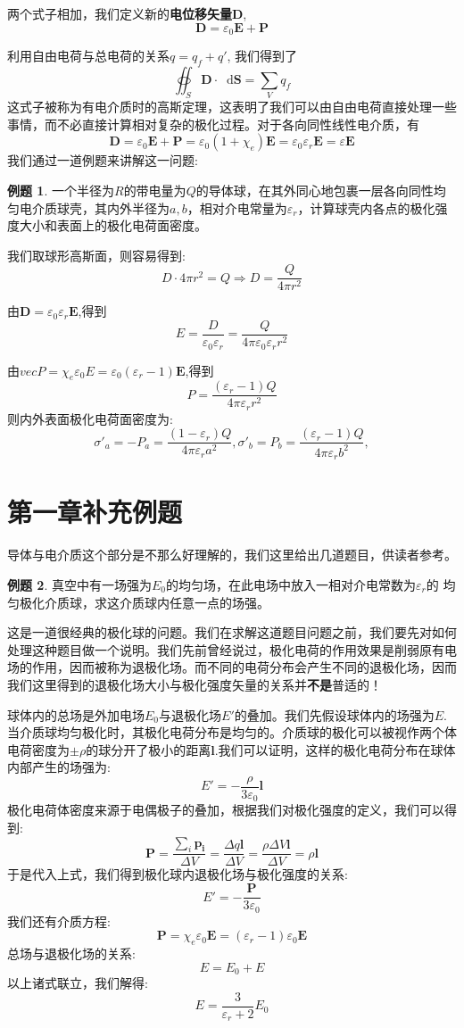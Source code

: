 \documentclass[12pt,a4paper,oneside]{report}
\theoremstyle{definition}
\newtheorem{example}{例题}[chapter]
\theoremstyle{remark}
\renewcommand{\d}{\mathop{}\!\mathrm{d}}
\begin{document}
两个式子相加，我们定义新的\textbf{电位移矢量}$\mathbf{D}$,
\[
\mathbf{D} = \varepsilon_0\mathbf{E}+\mathbf{P}
\]

利用自由电荷与总电荷的关系$q = q_f + q' $, 我们得到了
\[
\oiint_S \mathbf{D} \cdot \d \mathbf{S}  = \sum_V q_f
\]
这式子被称为有电介质时的高斯定理，这表明了我们可以由自由电荷直接处理一些事情，而不必直接计算相对复杂的极化过程。对于各向同性线性电介质，有
\[
\mathbf{D} = \varepsilon_0 \mathbf{E}+\mathbf{P} = \varepsilon_0 (1+\chi_e)\mathbf{E} = \varepsilon_0\varepsilon_r\mathbf{E}=\varepsilon \mathbf{E}
\]
我们通过一道例题来讲解这一问题:
\begin{example}
  一个半径为$R$的带电量为$Q$的导体球，在其外同心地包裹一层各向同性均匀电介质球壳，其内外半径为$a,b$，相对介电常量为$\varepsilon_r$，计算球壳内各点的极化强度大小和表面上的极化电荷面密度。

  我们取球形高斯面，则容易得到:
  \[
  D\cdot4\pi r^2 = Q \Rightarrow D=\frac{Q}{4\pi r^2}
  \]

  由$\mathbf{D} = \varepsilon_0\varepsilon_r\mathbf{E}$,得到
  \[
  E=\frac{D}{\varepsilon_0\varepsilon_r}=\frac{Q}{4\pi \varepsilon_0\varepsilon_r r^2}
  \]

  由$vec{P}=\chi_e \varepsilon_0 E = \varepsilon_0(\varepsilon_r-1)\mathbf{E}$,得到
  \[
  P=\frac{(\varepsilon_r-1)Q}{4\pi \varepsilon_rr^2}
  \]
  则内外表面极化电荷面密度为:
  \[
  \sigma'_a=-P_a = \frac{(1-\varepsilon_r)Q}{4\pi \varepsilon_ra^2},\sigma'_b=P_b = \frac{(\varepsilon_r-1)Q}{4\pi \varepsilon_rb^2},
  \]
\end{example}
\section{第一章补充例题}
导体与电介质这个部分是不那么好理解的，我们这里给出几道题目，供读者参考。
\begin{example}
真空中有一场强为$E_0$的均匀场，在此电场中放入一相对介电常数为$\varepsilon_r$的
均匀极化介质球，求这介质球内任意一点的场强。

这是一道很经典的极化球的问题。我们在求解这道题目问题之前，我们要先对如何处理这种题目做一个说明。我们先前曾经说过，极化电荷的作用效果是削弱原有电场的作用，因而被称为退极化场。而不同的电荷分布会产生不同的退极化场，因而我们这里得到的退极化场大小与极化强度矢量的关系并\textbf{不是}普适的！

球体内的总场是外加电场$E_0$与退极化场$E'$的叠加。我们先假设球体内的场强为$E$.当介质球均匀极化时，其极化电荷分布是均匀的。介质球的极化可以被视作两个体电荷密度为$\pm\rho$的球分开了极小的距离$\mathbf{l}$.我们可以证明，这样的极化电荷分布在球体内部产生的场强为:
\[
E'=-\frac{\rho}{3\varepsilon_0}\mathbf{l}
\]
极化电荷体密度来源于电偶极子的叠加，根据我们对极化强度的定义，我们可以得到:
\[
\mathbf{P}=\frac{\sum_i \mathbf{p_i}}{\Delta V}=\frac{\Delta q \mathbf{l}}{\Delta V}=\frac{\rho \Delta V \mathbf{l}}{\Delta V}=\rho \mathbf{l}
\]
于是代入上式，我们得到极化球内退极化场与极化强度的关系:
\[
E'=-\frac{\mathbf{P}}{3\varepsilon_0}
\]
我们还有介质方程:
\[
\mathbf{P}= \chi_e \varepsilon_0 \mathbf{E}= (\varepsilon_r-1)\varepsilon_0 \mathbf{E}
\]
总场与退极化场的关系:
\[
E=E_0+E
\]
以上诸式联立，我们解得:
\[
E=\frac{3}{\varepsilon_r+2}E_0
\]
\end{example}
\end{document}
